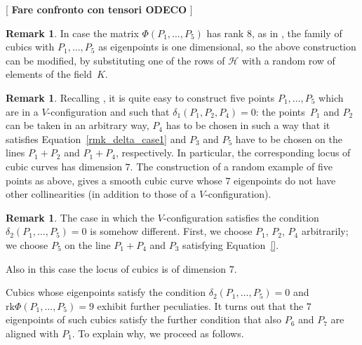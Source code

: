 \documentclass{amsart}
\theoremstyle{plain}
\theoremstyle{definition}
\newtheorem{rmk}[lemma]{Remark}
\newcommand{\blue}[1]{{\color{blue}  [#1]}}
\newcommand{\rk}{\ensuremath{\mathrm{rk}}}
\begin{document}
\blue{
\textbf{Fare confronto con tensori ODECO}
}

\begin{rmk}
In case the matrix $\Phi(P_1, \dots, P_5)$ has rank $8$, as in , the family of
cubics with $P_1, \dots, P_5$ as eigenpoints is one dimensional, so the
above construction can be modified, by substituting one of the rows of
$\mathcal{H}$ with a random row of elements of the field~$K$.
\end{rmk}

\begin{rmk}
\label{rmk:construction_five_d1}
Recalling , it is quite easy to construct five points $P_1, \dots, P_5$ which are in a $V$-configuration
and such that $\delta_1(P_1, P_2, P_4)= 0$: the points~$P_1$
and $P_2$ can be taken in an arbitrary way, $P_4$ has to be chosen in such
a way that it satisfies Equation~\eqref{rmk_delta_case1}
and $P_3$ and $P_5$ have to be chosen on the lines $P_1+P_2$ and $P_1+P_4$,
respectively. In particular, the corresponding locus of cubic curves
has dimension $7$.
The construction of a random example
of five points as above, gives a smooth cubic curve whose $7$ eigenpoints
do not have other collinearities (in addition to those of a
$V$-configuration).
\end{rmk}

\begin{rmk}
\label{rmk:construction_five_d2}
The case in which the $V$-configuration satisfies the condition
$\delta_2(P_1, \dots, P_5) = 0$ is somehow different.
First, we choose $P_1$, $P_2$, $P_4$ arbitrarily; we choose $P_5$ on the line $P_1 + P_4$ and $P_3$ satisfying Equation~\eqref{}.

Also in this case the locus of cubics is of dimension $7$.
\end{rmk}

Cubics whose eigenpoints satisfy the condition $\delta_2(P_1, \dotsc, P_5) = 0$ and $\rk \Phi(P_1, \dotsc, P_5) = 9$ exhibit further peculiaties. It turns out that the $7$ eigenpoints of such cubics satisfy the further
condition that also $P_6$ and $P_7$ are aligned with $P_1$. To explain
why, we proceed as follows.
\end{document}
